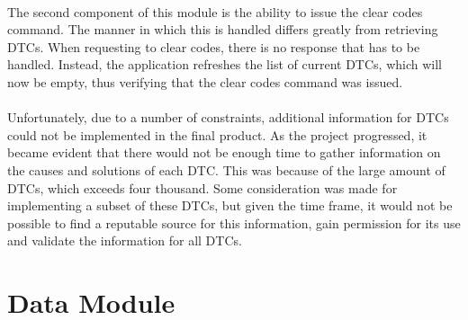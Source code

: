 		\paragraph{}{
		The second component of this module is the ability to issue the clear codes command. The manner in which this is handled differs greatly from retrieving DTCs. When requesting to clear codes, there is no response that has to be handled. Instead, the application refreshes the list of current DTCs, which will now be empty, thus verifying that the clear codes command was issued.
		}
		
		\paragraph{}{
		Unfortunately, due to a number of constraints, additional information for DTCs could not be implemented in the final product. As the project progressed, it became evident that there would not be enough time to gather information on the causes and solutions of each DTC. This was because of the large amount of DTCs, which exceeds four thousand. Some consideration was made for implementing a subset of these DTCs, but given the time frame, it would not be possible to find a reputable source for this information, gain permission for its use and validate the information for all DTCs.
		}						
		
\section{Data Module}
